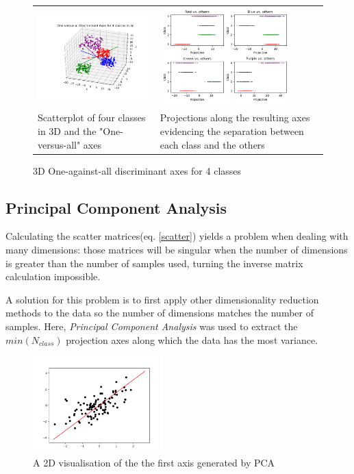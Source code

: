 \documentclass{bmvc2k}
\begin{document}
\begin{figure}[H]
   \begin{center}
      \begin{tabular}{p{5cm} p{5cm}}
         \includegraphics[width=5cm]{figures/3ddiscriminantAxes.png}&\includegraphics[width=5cm]{figures/3dProjections.png}\\
         Scatterplot of four classes in 3D and the "One-versus-all" axes&Projections along the resulting axes evidencing the separation between each class and the others
      \end{tabular}
   \end{center}
   \caption{3D One-against-all discriminant axes for 4 classes}
\end{figure}

\subsection{Principal Component Analysis}

Calculating the scatter matrices(eq. \ref{scatter}) yields a problem when dealing with many dimensions: those matrices will be singular when the number of dimensions is greater than the number of samples used, turning the inverse matrix calculation impossible\cite{singular}.

A solution for this problem is to first apply other dimensionality reduction methods to the data so the number of dimensions matches the number of samples\cite{face}. Here, \textit{Principal Component Analysis} was used to extract the $min(N_{class})$ projection axes along which the data has the most variance.

\begin{figure}[H]
   \begin{center}
         \includegraphics[width=5cm]{figures/PCA.png}
   \end{center}
   \caption{A 2D visualisation of the the first axis generated by PCA}
\end{figure}
\end{document}
